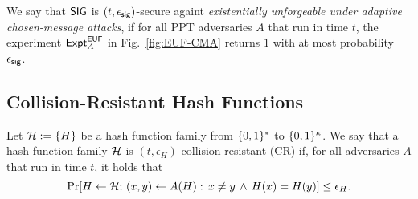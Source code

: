 \begin{definition}
  We say that $\mathsf{SIG}$ is $(t, \epsilon_{\mathsf{sig}})$-secure againt \textit{existentially  unforgeable under adaptive chosen-message attacks},
if for all PPT adversaries $A$ that run in time $t$, the experiment $\mathsf{Expt}^{\sf EUF}_{A}$
in Fig.~\ref{fig:EUF-CMA} returns $1$ with at most probability $\epsilon_{\sf sig}$.

\begin{figure*}[!htb]
\begin{center}
\caption{EUF-CMA security experiment}\label{fig:EUF-CMA}
\end{center}
\end{figure*}

\end{definition}

\subsection{Collision-Resistant Hash Functions} \label{sec:CRH}
Let $\mathcal{H}:= \{H\}$ be a hash function family from $\{0,1\}^*$ to $\{0,1\}^{\kappa}$.
We say that a hash-function family $\mathcal{H}$ is $(t,\epsilon_{H})$-collision-resistant
(CR) if,
for all adversaries $A$ that run in time $t$, it holds that
\begin{equation}
 \Pr[H \gets {\mathcal{H}}; \, (x,y) \gets A(H): \, x \neq y \, \wedge \,
H(x) = H(y)] \leq \epsilon_{H}.
\end{equation}

